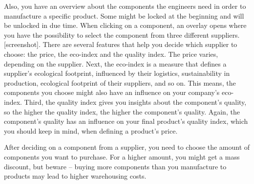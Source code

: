 Also, you have an overview about the components the engineers need in order to manufacture a specific product. Some might be locked at the beginning and will be unlocked in due time. When clicking on a component, an overlay opens where you have the possibility to select the component from three different suppliers. [screenshot]. There are several features that help you decide which supplier to choose: the price, the eco-index and the quality index. The price varies, depending on the supplier. Next, the eco-index is a measure that defines a supplier’s ecological footprint, influenced by their logistics, sustainability in production, ecological footprint of their suppliers, and so on. This means, the components you choose might also have an influence on your company’s eco-index. Third, the quality index gives you insights about the component’s quality, so the higher the quality index, the higher the component’s quality. Again, the component’s quality has an influence on your final product’s quality index, which you should keep in mind, when defining a product’s price.

After deciding on a component from a supplier, you need to choose the amount of components you want to purchase. For a higher amount, you might get a mass discount, but beware --  buying more components than you manufacture to products may lead to higher warehousing costs. 



